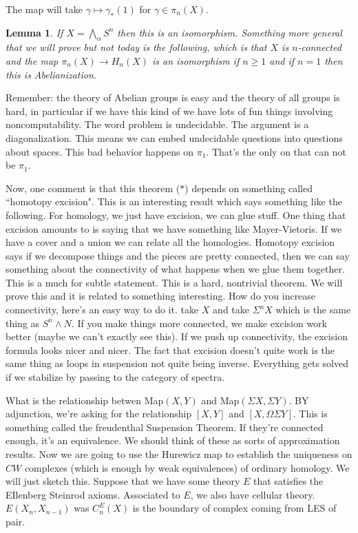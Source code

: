 \documentclass[10pt]{article}
\newtheorem{lemma}[theorem]{Lemma}
\theoremstyle{definition}
\begin{document}
The map will take $\gamma\mapsto \gamma_\ast(1)$ for $\gamma\in \pi_n(X)$. 

\begin{lemma}{1}
	If $X=\bigwedge_\alpha S^n$ then this is an isomorphism. Something more general that we will prove but not today is the following, which is that $X$ is $n$-connected and the map $\pi_n(X)\to H_n(X)$ is an isomorphism if $n\geq 1$ and if $n=1$ then this is Abelianization. 	
\end{lemma} 

Remember: the theory of Abelian groups is easy and the theory of all groups is hard, in particular if we have this kind of we have lots of fun things involving noncomputability. The word problem is undecidable. The argument is a diagonalization. This means we can embed undecidable questions into questions about spaces. This bad behavior happens on $\pi_1$. That's the only on that can not be $\pi_1$. 

Now, one comment is that this theorem ($\ast$) depends on something called ``homotopy excision". This is an interesting result which says something like the following. For homology, we just have excision, we can glue stuff. One thing that excision amounts to is saying that we have something like Mayer-Vietoris. If we have a cover and a union we can relate all the homologies. Homotopy excision says if we decompose things and the pieces are pretty connected, then we can say something about the connectivity of what happens when we glue them together. This is a much for subtle statement. This is a hard, nontrivial theorem. We will prove this and it is related to something interesting. How do you increase connectivity, here's an easy way to do it. take $X$ and take $\Sigma^n X$ which is the same thing as $S^n\wedge N$. If you make things more connected, we make excision work better (maybe we can't exactly see this). If we push up connectivity, the excision formula looks nicer and nicer. The fact that excision doesn't quite work is the same thing as loops in suspension not quite being inverse. Everything gets solved if we stabilize by passing to the category of spectra. 

What is the relationship betwen \textsf{Map}$(X,Y)$ and \textsf{Map}$(\Sigma X,\Sigma Y)$. BY adjunction, we're asking for the relationship $[X,Y]$ and $[X,\Omega\Sigma Y]$. This is something called the 
freudenthal Suspension Theorem. If they're connected enough, it's an equivalence. We should think of these as sorts of approximation results. Now we are going to use the Hurewicz map to establish the uniqueness on $CW$ complexes (which is enough by weak equivalences) of ordinary homology. We will just sketch this. Suppose that we have some theory $E$ that satisfies the EIlenberg Steinrod axioms. Associated to $E$, we also have cellular theory.  $E(X_n, X_{n-1})$ was $C_n^E(X)$ is the boundary of complex coming from LES of pair. 
\end{document}
